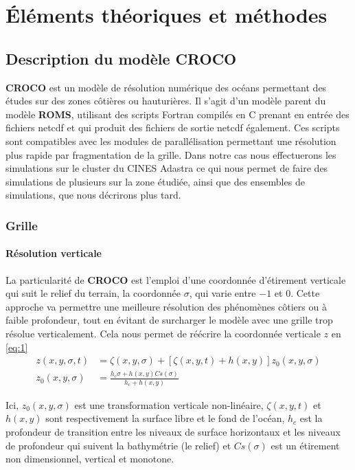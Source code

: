 \chapter{Éléments théoriques et méthodes}

\section{Description du modèle \textbf{CROCO}}
\textbf{CROCO} \cite{noauthor_crocos_nodate} est un modèle de résolution numérique des océans permettant des études sur des zones côtières ou hauturières. Il s'agit d'un modèle parent du modèle \textbf{ROMS}, utilisant des scripts Fortran compilés en C prenant en entrée des fichiers netcdf et qui produit des fichiers de sortie netcdf également. Ces scripts sont compatibles avec les modules de parallélisation permettant une résolution plus rapide par fragmentation de la grille. Dans notre cas nous effectuerons les simulations sur le cluster du CINES Adastra ce qui nous permet de faire des simulations de plusieurs sur la zone étudiée, ainsi que des ensembles de simulations, que nous décrirons plus tard.

\subsection{Grille}
\subsubsection{Résolution verticale}
La particularité de \textbf{CROCO} est l'emploi d'une coordonnée d'étirement verticale qui suit le relief du terrain, la coordonnée $\sigma$, qui varie entre $-1$ et $0$. Cette approche va permettre une meilleure résolution des phénomènes côtiers ou à faible profondeur, tout en évitant de surcharger le modèle avec une grille trop résolue verticalement. Cela nous permet de réécrire la coordonnée verticale $z$ en \autoref{eq:1}
\begin{subequations} \label{eq:1}
    \begin{align}
        z(x,y,\sigma,t)  & = \zeta(x,y,\sigma) +  \left[ \zeta(x,y,t) + h(x,y) \right]  z_0(x,y,\sigma) \label{eq:1a} \\
        z_0 (x,y,\sigma) & = \frac{ h_c \sigma + h(x,y)Cs(\sigma)}{h_c+h(x,y)} \label{eq:1b}
    \end{align}
\end{subequations}

Ici, $z_0(x,y,\sigma)$ est une transformation verticale non-linéaire, $\zeta(x,y,t)$ et $h(x,y)$ sont respectivement la surface libre et le fond de l'océan, $h_c$ est la profondeur de transition entre les niveaux de surface horizontaux et les niveaux de profondeur qui suivent la bathymétrie (le relief) et $Cs(\sigma)$ est un étirement non dimensionnel, vertical et monotone. 

